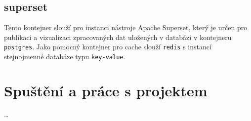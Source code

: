 \documentclass[10pt,a4paper,titlepage]{extarticle}
\begin{document}
    \subsection{superset}

    Tento kontejner slouží pro instanci nástroje Apache Superset, který je určen pro publikaci a vizualizaci
    zpracovaných dat uložených v databázi v kontejneru \texttt{postgres}. Jako pomocný kontejner pro cache slouží
    \texttt{redis} s instancí stejnojmenné databáze typu \texttt{key-value}.

    \section{Spuštění a práce s projektem}

    \ldots
\end{document}
